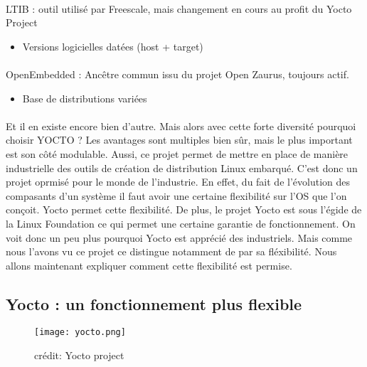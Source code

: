 \paragraph{}
LTIB : outil utilisé par Freescale, mais changement en
cours au profit du Yocto Project

\begin{itemize} 

\item Versions logicielles datées (host + target)

\end{itemize} 



\paragraph{}
OpenEmbedded : Ancêtre commun issu du projet Open Zaurus, toujours actif.
\begin{itemize} 

\item Base de distributions variées

\end{itemize} 
\paragraph{}
Et il en existe encore bien d'autre. Mais alors avec cette forte diversité pourquoi choisir YOCTO ?
Les avantages sont multiples bien sûr, mais le plus important est son côté modulable.
Aussi, ce projet permet de mettre en place de manière industrielle des outils de création de distribution Linux embarqué. C'est donc un projet oprmisé pour le monde de l'industrie.
En effet, du fait de l'évolution des compasants d'un système il faut avoir une certaine flexibilité sur l'OS que l'on conçoit. Yocto permet cette flexibilité.
De plus, le projet Yocto est sous l'égide de la Linux Foundation ce qui permet une certaine garantie de fonctionnement.
On voit donc un peu plus pourquoi Yocto est apprécié des industriels.
Mais comme nous l'avons vu ce projet ce distingue notamment de par sa fléxibilité.
Nous allons maintenant expliquer comment cette flexibilité est permise.





\subsection{Yocto : un fonctionnement plus flexible}
\begin{figure}[ht!]

\texttt{[image: yocto.png]} %

\caption{crédit: Yocto project} %


\label{Project Yocto} %
\end{figure}


